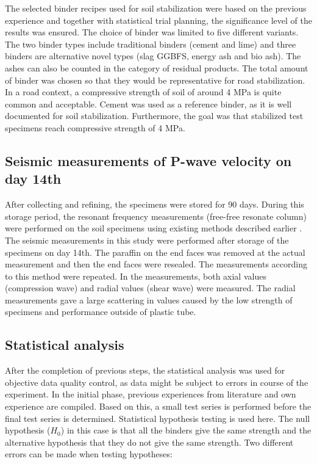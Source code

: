 \documentclass[constrmater,article,submit,pdftex,moreauthors]{Definitions/mdpi}
\begin{document}
The selected binder recipes used for soil stabilization were based on the previous experience and together with statistical trial planning, the significance level of the results was ensured. The choice of binder was limited to five different variants. The two binder types include traditional binders (cement and lime) and three binders are alternative novel types (slag GGBFS, energy ash and bio ash). The ashes can also be counted in the category of residual products. The total amount of binder was chosen so that they would be representative for road stabilization. In a road context, a compressive strength of soil of around 4 MPa is quite common and acceptable. Cement was used as a reference binder, as it is well documented for soil stabilization. Furthermore, the goal was that stabilized test specimens reach compressive strength of 4 MPa. 

\subsection{Seismic measurements of P-wave velocity on day 14th}
After collecting and refining, the specimens were stored for 90 days. During this storage period, the resonant frequency measurements (free-free resonate column) were performed on the soil specimens using existing methods described earlier \citep{Aldaood,Lindh2021b,Lindh2022c,ThomasRangaswamy,Ryden}. The seismic measurements in this study were performed after storage of the specimens on day 14th. The paraffin on the end faces was removed at the actual measurement and then the end faces were resealed. The measurements according to this method were repeated. In the measurements, both axial values (compression wave) and radial values (shear wave) were measured. The radial measurements gave a large scattering in values caused by the low strength of specimens and performance outside of plastic tube.

\subsection{Statistical analysis}
After the completion of previous steps, the statistical analysis was used for objective data quality control, as data might be subject to errors in course of the experiment. In the initial phase, previous experiences from literature and own experience are compiled. Based on this, a small test series is performed before the final test series is determined. Statistical hypothesis testing is used here.  The null hypothesis ($H_0$) in this case is that all the binders give the same strength and the alternative hypothesis that they do not give the same strength. Two different errors can be made when testing hypotheses:
\end{document}
